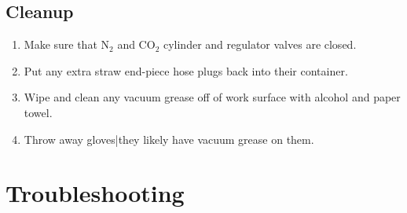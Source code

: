 \documentclass[letterpaper,12pt]{article}
\begin{document}
\subsection{Cleanup}
	\begin{enumerate}
		\item Make sure that N$_2$ and CO$_2$ cylinder and regulator valves are closed.
		\item Put any extra straw end-piece hose plugs back into their container.
		\item Wipe and clean any vacuum grease off of work surface with alcohol and paper towel.
		\item Throw away gloves|they likely have vacuum grease on them.
	\end{enumerate}



\section{Troubleshooting}
\end{document}
